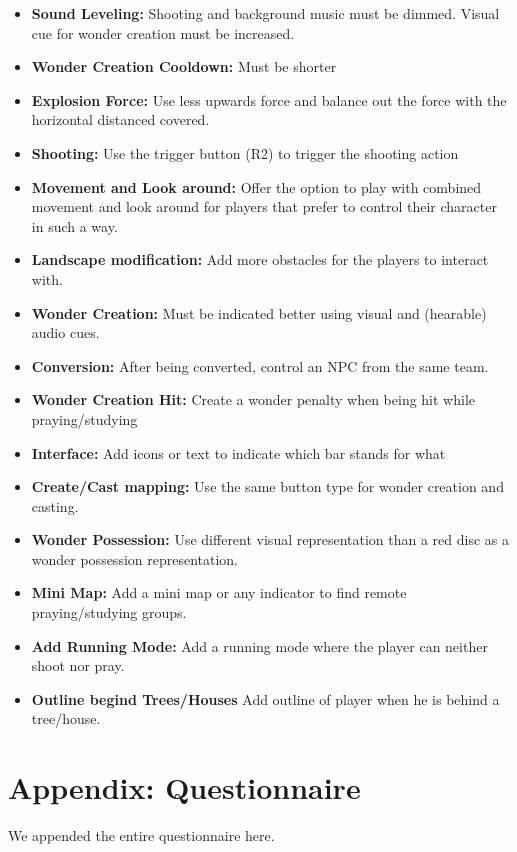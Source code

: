 \documentclass[11pt,a4paper,titlepage,table]{article}
\begin{document}
\begin{itemize}
	\item \textbf{Sound Leveling:} Shooting and background music must be dimmed. Visual cue for wonder creation must be increased.
		\item \textbf{Wonder Creation Cooldown:} Must be shorter
	\item \textbf{Explosion Force:}  Use less upwards force and balance out the force with the horizontal distanced covered.
	\item \textbf{Shooting:} Use the trigger button (R2) to trigger the shooting action
	\item \textbf{Movement and Look around:} Offer the option to play with combined movement and look around for players that prefer to control their character in such a way.
	\item \textbf{Landscape modification:} Add more obstacles for the players to interact with.
	\item \textbf{Wonder Creation:} Must be indicated better using visual and (hearable) audio cues.
	\item \textbf{Conversion:} After being converted, control an NPC from the same team.
	\item \textbf{Wonder Creation Hit:} Create a wonder penalty when being hit while praying/studying
	\item \textbf{Interface:} Add icons or text to indicate which bar stands for what
	\item \textbf{Create/Cast mapping:} Use the same button type for wonder creation and casting.
	\item \textbf{Wonder Possession:} Use different visual representation than a red disc as a wonder possession representation.
	\item \textbf{Mini Map:} Add a mini map or any indicator to find remote praying/studying groups.
	\item \textbf{Add Running Mode:} Add a running mode where the player can neither shoot nor pray.
	\item \textbf{Outline begind Trees/Houses} Add outline of player when he is behind a tree/house.
\end{itemize}

\section{Appendix: Questionnaire}
We appended the entire questionnaire here.
\label{sec:questionnaire}

\end{document}
